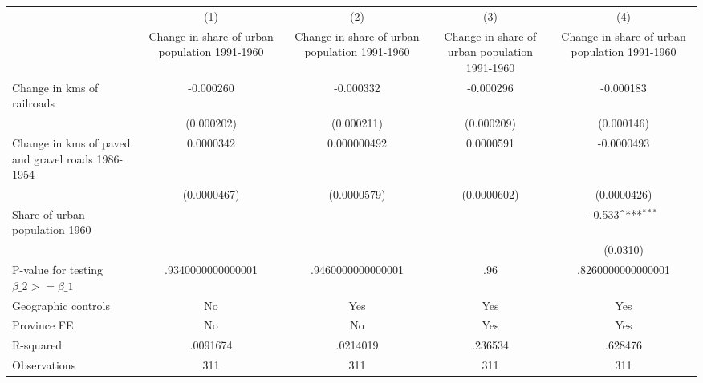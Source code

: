 {
\def\sym#1{\ifmmode^{#1}\else\(^{#1}\)\fi}
\begin{tabular}{l*{4}{c}}
\hline\hline
                &\multicolumn{1}{c}{(1)}&\multicolumn{1}{c}{(2)}&\multicolumn{1}{c}{(3)}&\multicolumn{1}{c}{(4)}\\
                &\multicolumn{1}{c}{Change in share of urban population 1991-1960}&\multicolumn{1}{c}{Change in share of urban population 1991-1960}&\multicolumn{1}{c}{Change in share of urban population 1991-1960}&\multicolumn{1}{c}{Change in share of urban population 1991-1960}\\
\hline
Change in kms of railroads&-0.000260         &-0.000332         &-0.000296         &-0.000183         \\
                &(0.000202)         &(0.000211)         &(0.000209)         &(0.000146)         \\
[1em]
Change in kms of paved and gravel roads 1986-1954&0.0000342         &0.000000492         &0.0000591         &-0.0000493         \\
                &(0.0000467)         &(0.0000579)         &(0.0000602)         &(0.0000426)         \\
[1em]
Share of urban population 1960&                  &                  &                  &   -0.533\sym{***}\\
                &                  &                  &                  & (0.0310)         \\
\hline
P-value for testing $\beta\_{2} >= \beta\_{1}$&.9340000000000001         &.9460000000000001         &      .96         &.8260000000000001         \\
Geographic controls&       No         &      Yes         &      Yes         &      Yes         \\
Province FE     &       No         &       No         &      Yes         &      Yes         \\
R-squared       & .0091674         & .0214019         &  .236534         &  .628476         \\
Observations    &      311         &      311         &      311         &      311         \\
\hline\hline
\end{tabular}
}
